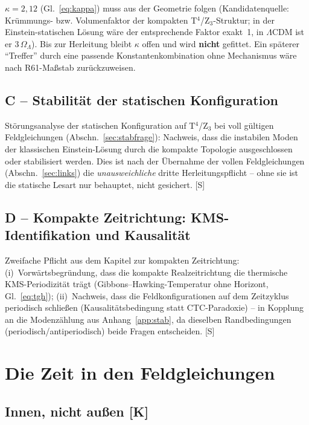 \documentclass[11pt]{report}
\begin{document}
$\kappa = 2{,}12$ (Gl.~\eqref{eq:kappa}) muss aus der Geometrie
folgen (Kandidatenquelle: Krümmungs- bzw. Volumenfaktor der
kompakten T$^4$/Z$_3$-Struktur; in der Einstein-statischen Lösung
wäre der entsprechende Faktor exakt~1, in $\Lambda$CDM ist er
$3\,\Omega_\Lambda$). Bis zur Herleitung bleibt $\kappa$ offen und
wird \textbf{nicht} gefittet. Ein späterer \enquote{Treffer} durch
eine passende Konstantenkombination ohne Mechanismus wäre nach
R61-Maßstab zurückzuweisen.

\section{C -- Stabilität der statischen Konfiguration}

Störungsanalyse der statischen Konfiguration auf T$^4$/Z$_3$ bei
voll gültigen Feldgleichungen (Abschn.~\ref{sec:stabfrage}): Nachweis, dass die
instabilen Moden der klassischen Einstein-Lösung durch die kompakte
Topologie ausgeschlossen oder stabilisiert werden. Dies ist nach der
Übernahme der vollen Feldgleichungen (Abschn.~\ref{sec:links}) die
\emph{unausweichliche} dritte Herleitungspflicht -- ohne sie ist
die statische Lesart nur behauptet, nicht gesichert. [S]

\section{D -- Kompakte Zeitrichtung: KMS-Identifikation und
Kausalität}

Zweifache Pflicht aus dem Kapitel zur kompakten Zeitrichtung:
(i)~Vorwärtsbegründung, dass die kompakte Realzeitrichtung die
thermische KMS-Periodizität trägt (Gibbons--Hawking-Temperatur ohne
Horizont, Gl.~\eqref{eq:tgh}); (ii)~Nachweis, dass die
Feldkonfigurationen auf dem Zeitzyklus periodisch schließen
(Kausalitätsbedingung statt CTC-Paradoxie) -- in Kopplung an die
Modenzählung aus Anhang~\ref{app:stab}, da dieselben Randbedingungen
(periodisch/antiperiodisch) beide Fragen entscheiden. [S]

\chapter{Die Zeit in den Feldgleichungen}

\section{Innen, nicht außen [K]}
\end{document}
